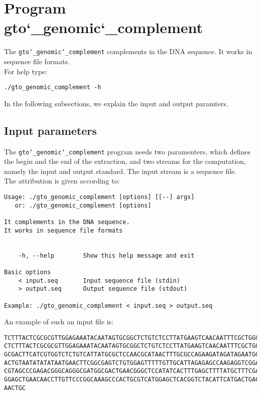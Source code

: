 \section{Program gto\char`_genomic\char`_complement}
The \texttt{gto\char`_genomic\char`_complement} complements in the DNA sequence. It works in sequence file formats.\\
For help type:
\begin{lstlisting}
./gto_genomic_complement -h
\end{lstlisting}
In the following subsections, we explain the input and output paramters.

\subsection*{Input parameters}

The \texttt{gto\char`_genomic\char`_complement}  program needs two paramenters, which defines the begin and the end of the extraction, and two streams for the computation, namely the input and output standard. The input stream is a sequence file.\\
The attribution is given according to:
\begin{lstlisting}
Usage: ./gto_genomic_complement [options] [[--] args]
   or: ./gto_genomic_complement [options]

It complements in the DNA sequence.
It works in sequence file formats


    -h, --help        Show this help message and exit

Basic options
    < input.seq       Input sequence file (stdin)
    > output.seq      Output sequence file (stdout)

Example: ./gto_genomic_complement < input.seq > output.seq
\end{lstlisting}
An example of such an input file is:
\begin{lstlisting}
TCTTTACTCGCGCGTTGGAGAAATACAATAGTGCGGCTCTGTCTCCTTATGAAGTCAACAATTTCGCTGGGACTTGCGG
CTCTTTACTCGCGCGTTGGAGAAATACAATAGTGCGGCTCTGTCTCCTTATGAAGTCAACAATTTCGCTGGGACTTGCG
GCGACTTCATCGTGGTCTCTGTCATTATGCGCTCCAACGCATAACTTTGCGCCAGAAGATAGATAGAATGGTGTAAGAA
ACTGTAATATATATAATGAACTTCGGCGAGTCTGTGGAGTTTTTGTTGCATTAGAGAGCCAAGAGGTCGGACGTCCTCA
CGTAGCCCGAGACGGGCAGGGCGATGGCGACTGAACGGGCTCCATATCACTTTGAGCTTTTATGCTTTCGACTCCTCCA
GGAGCTGAACAACCTTGTTCCCGGCAAAGCCCACTGCGTCATGGAGCTCACGGTCTACATTCATGACTGACTAACCGTA
AACTGC
\end{lstlisting}

